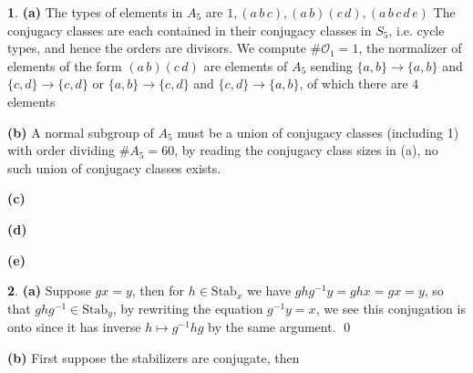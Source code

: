 \documentclass[10.5pt]{article}
\theoremstyle{definition}
\newtheorem{pb}{}
\newcommand{\set}[1]{\{#1\}}
\begin{document}
    \begin{pb}
        \textbf{(a)}
            The types of elements in \(A_5\) are \(1,(a\,b\,c), (a\,b)(c\,d),(a\,b\,c\,d\,e)\) The conjugacy classes are each contained in their conjugacy classes in \(S_5\), i.e. cycle types, and hence the orders are divisors. We compute \(\#\mathcal{O}_1 = 1\), the normalizer of elements of the form \((a\,b)(c\,d)\) are elements of \(A_5\) sending \(\set{a,b} \to \set{a,b}\) and \(\set{c,d} \to \set{c,d}\) or \(\set{a,b} \to \set{c,d}\) and \(\set{c,d} \to \set{a,b}\), of which there are \(4\) elements

        \textbf{(b)} A normal subgroup of \(A_5\) must be a union of conjugacy classes (including 1) with order dividing \(\#A_5 = 60\), by reading the conjugacy class sizes in (a), no such union of conjugacy classes exists.

        \textbf{(c)}

        \textbf{(d)}

        \textbf{(e)}
    \end{pb}
    \begin{pb}
        \textbf{(a)} Suppose \(gx = y\), then for \(h \in \text{Stab}_x\) we have \(ghg^{-1}y = ghx = gx = y\), so that \(ghg^{-1} \in \text{Stab}_y\), by rewriting the equation \(g^{-1}y = x\), we see this conjugation is onto since it has inverse \(h \mapsto g^{-1}hg\) by the same argument. \qed
        
        \textbf{(b)} First suppose the stabilizers are conjugate, then 
    \end{pb}
\end{document}

